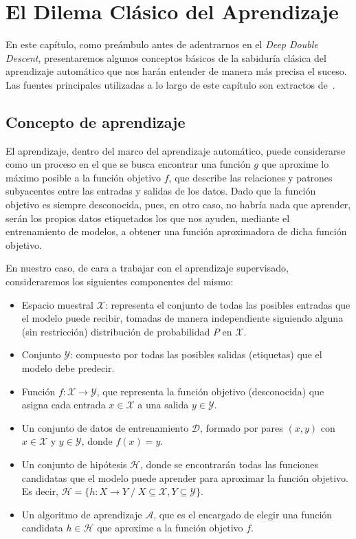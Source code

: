 \chapter{El Dilema Clásico del Aprendizaje}\label{ch:dilema-aprendizaje}

En este capítulo, como preámbulo antes de adentrarnos en el \textit{Deep Double Descent}, presentaremos algunos conceptos básicos de la sabiduría clásica del aprendizaje automático que nos harán entender de manera más precisa el suceso. Las fuentes principales utilizadas a lo largo de este capítulo son extractos de~\cite{Mostafa2012, Bishop2006}.

\section{Concepto de aprendizaje}\label{sec:concepto-de-aprendizaje}
El aprendizaje, dentro del marco del aprendizaje automático, puede considerarse como un proceso en el que se busca encontrar una función $g$ que aproxime lo máximo posible a la función objetivo $f$, que describe las relaciones y patrones subyacentes entre las entradas y salidas de los datos. Dado que la función objetivo es siempre desconocida, pues, en otro caso, no habría nada que aprender, serán los propios datos etiquetados los que nos ayuden, mediante el entrenamiento de modelos, a obtener una función aproximadora de dicha función objetivo.

En nuestro caso, de cara a trabajar con el aprendizaje supervisado, consideraremos los siguientes componentes del mismo:
\begin{itemize}
    \item Espacio muestral $\mathcal{X}$: representa el conjunto de todas las posibles entradas que el modelo puede recibir, tomadas de manera independiente siguiendo alguna (sin restricción) distribución de probabilidad $P$ en $\mathcal{X}$.
    \item Conjunto $\mathcal{Y}$: compuesto por todas las posibles salidas (etiquetas) que el modelo debe predecir.
    \item Función $f: \mathcal{X} \rightarrow \mathcal{Y}$, que representa la función objetivo (desconocida) que asigna cada entrada $x \in \mathcal{X}$ a una salida $y \in \mathcal{Y}$.
    \item Un conjunto de datos de entrenamiento $\mathcal{D}$, formado por pares $(x, y)$ con $x \in \mathcal{X}$ y $y \in \mathcal{Y}$, donde $f(x) = y$.
    \item Un conjunto de hipótesis $\mathcal{H}$, donde se encontrarán todas las funciones candidatas que el modelo puede aprender para aproximar la función objetivo. Es decir, $\mathcal{H} = \{h: X \rightarrow Y \; / \; X \subseteq \mathcal{X}, Y \subseteq \mathcal{Y}\}$. 
    \item Un algoritmo de aprendizaje $\mathcal{A}$, que es el encargado de elegir una función candidata $h \in \mathcal{H}$ que aproxime a la función objetivo $f$.
\end{itemize}

